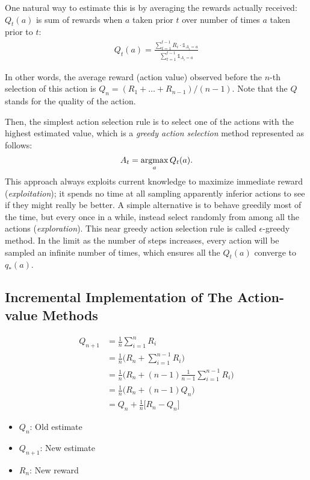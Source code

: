 One natural way to estimate this is by averaging the rewards actually received: $Q_t(a)$ is sum of rewards when $a$ taken prior $t$ over number of times $a$ taken prior to $t$:
\begin{align*}
	Q_t(a) = \frac{\sum_{t=1}^{t-1}R_i \cdot \mathds{1}_{A_i=a}}{\sum_{t=1}^{t-1}\mathds{1}_{A_i=a}}
\end{align*}

In other words, the average reward (action value) observed before the $n$-th selection of this action is $Q_n = (R_1+\dots+R_{n-1})/(n-1)$. Note that the $Q$ stands for the quality of the action. 

Then, the simplest action selection rule is to select one of the actions with the highest estimated value, which is a \textit{greedy action selection} method represented as follows:
$$A_t=\operatorname*{\operatorname{argmax}}_{a}Q_t(a).$$
This approach always exploits current knowledge to maximize immediate reward (\ie \textit{exploitation}); it spends no time at all sampling apparently inferior actions to see if they might really be better. A simple alternative is to behave greedily most of the time, but every once in a while, instead select randomly from among all the actions (\ie \textit{exploration}). This near greedy action selection rule is called $\epsilon$-greedy method. In the limit as the number of steps increases, every action will be sampled an infinite number of times, which ensures all the $Q_t(a)$ converge to $q_*(a)$.

\subsection{Incremental Implementation of The Action-value Methods}
\begin{align*}
	Q_{n+1} &= \frac{1}{n}\sum_{i=1}^{n}R_i\\
	&= \frac{1}{n} \Bigg(R_n + \sum_{i=1}^{n-1}R_i \Bigg)\\
	&= \frac{1}{n} \Bigg(R_n + (n-1)\frac{1}{n-1} \sum_{i=1}^{n-1}R_i \Bigg)\\
	&= \frac{1}{n} \Bigg(R_n + (n-1)Q_n \Bigg)\\
	&=  Q_n + \frac{1}{n} \Big[R_n - Q_n \Big]
\end{align*}
\begin{itemize}
	\item $Q_n$: Old estimate
	\item $Q_{n+1}$: New estimate
	\item $R_{n}$: New reward
\end{itemize}

